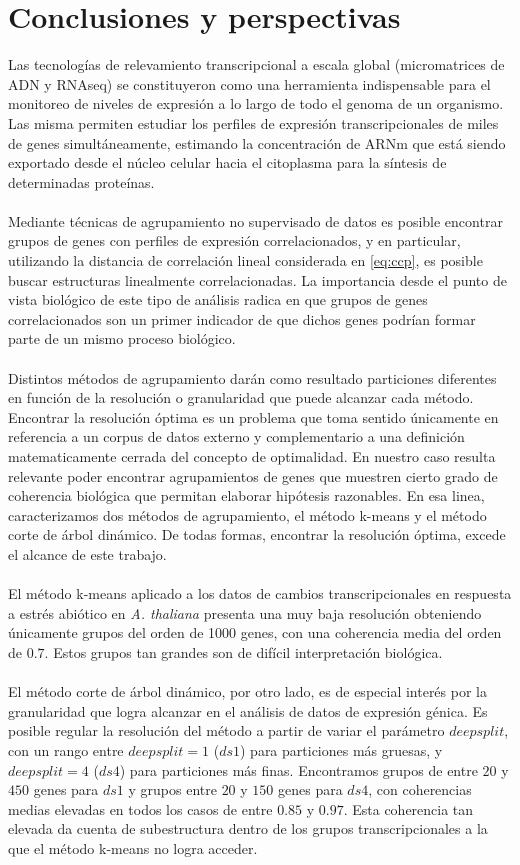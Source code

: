 \chapter{Conclusiones y perspectivas}
Las tecnologías de relevamiento transcripcional a escala global (micromatrices de ADN y RNAseq) se constituyeron como  una herramienta indispensable para el monitoreo de niveles de expresión a lo largo de todo el genoma de un organismo. Las misma permiten estudiar los perfiles de expresión transcripcionales de miles de genes simultáneamente, estimando la concentración de ARNm que está siendo exportado desde el núcleo celular hacia el citoplasma para la síntesis de determinadas proteínas.\\\\
Mediante técnicas de agrupamiento no supervisado de datos es posible encontrar grupos de genes con perfiles de expresión correlacionados, y en particular, utilizando la distancia de correlación lineal considerada en \ref{eq:ccp}, es posible buscar estructuras linealmente correlacionadas. La importancia desde el punto de vista biológico de este tipo de análisis radica en que grupos de genes correlacionados son un primer indicador de que dichos genes podrían formar parte de un mismo proceso biológico.\\\\
Distintos métodos de agrupamiento darán como resultado particiones diferentes en función de la resolución o granularidad que puede alcanzar cada método. Encontrar la resolución óptima es un problema que toma sentido únicamente en referencia a un corpus de datos externo y complementario a una definición matematicamente cerrada del concepto de optimalidad. En nuestro caso resulta relevante poder encontrar agrupamientos de genes que muestren cierto grado de coherencia biológica que permitan elaborar hipótesis razonables. En esa linea, caracterizamos dos métodos de agrupamiento, el método k-means y el método corte de árbol dinámico. De todas formas, encontrar la resolución óptima, excede el alcance de este trabajo.\\\\
El método k-means aplicado a los datos de cambios transcripcionales en respuesta a estrés abiótico en \textit{A. thaliana} presenta una muy baja resolución obteniendo únicamente grupos del orden de 1000 genes, con una coherencia media del orden de $0.7$. Estos grupos tan grandes son de difícil interpretación biológica.\\\\
El método corte de árbol dinámico, por otro lado, es de especial interés por la granularidad que logra alcanzar en el análisis de datos de expresión génica. Es posible regular la resolución del método a partir de variar el parámetro $deepsplit$, con un rango entre $deepsplit=1$ ($ds1$) para particiones más gruesas, y $deepsplit=4$ ($ds4$) para particiones más finas. Encontramos grupos de entre $20$ y $450$ genes para $ds1$ y grupos entre $20$ y $150$ genes para $ds4$, con coherencias medias elevadas en todos los casos de entre $0.85$ y $0.97$. Esta coherencia tan elevada da cuenta de subestructura dentro de los grupos transcripcionales a la que el método k-means no logra acceder.\\\\ 
